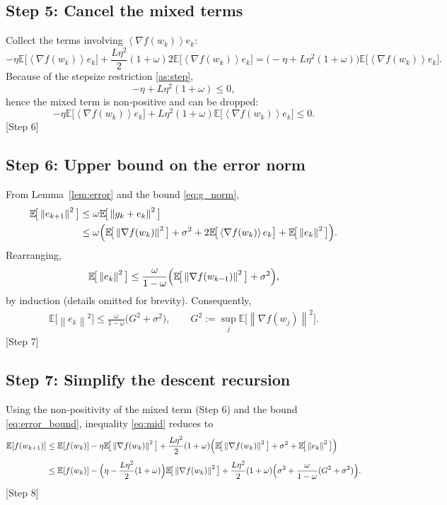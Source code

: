 \documentclass{article}
\newcommand{\E}{\mathbb{E}}
\newcommand{\norm}[1]{\left\lVert #1\right\rVert}
\newcommand{\inner}[1]{\left\langle #1\right\rangle}
\begin{document}
\subsection*{Step 5: Cancel the mixed terms}
Collect the terms involving $\inner{\nabla f(w_k)}{e_k}$:
\[
    -\eta\E\!\big[\inner{\nabla f(w_k)}{e_k}\big]
    +\frac{L\eta^{2}}{2}(1+\omega)2\E\!\big[\inner{\nabla f(w_k)}{e_k}\big]
    =\bigl(-\eta+L\eta^{2}(1+\omega)\bigr)
      \E\!\big[\inner{\nabla f(w_k)}{e_k}\big].
\]
Because of the stepsize restriction \eqref{as:step},
\[
    -\eta+L\eta^{2}(1+\omega)\le 0,
\]
hence the mixed term is non‑positive and can be dropped:
\[
    -\eta\E\!\big[\inner{\nabla f(w_k)}{e_k}\big]
    +L\eta^{2}(1+\omega)\E\!\big[\inner{\nabla f(w_k)}{e_k}\big]\le0.
\]
[Step 6]

\subsection*{Step 6: Upper bound on the error norm}
From Lemma~\ref{lem:error} and the bound \eqref{eq:g_norm},
\begin{align}
    \E\!\big[\norm{e_{k+1}}^{2}\big]
    &\le\omega\E\!\big[\norm{g_k+e_k}^{2}\big]                                   \nonumber\\
    &\le\omega\Bigl(\E\!\big[\norm{\nabla f(w_k)}^{2}\big]
                +\sigma^{2}
                +2\E\!\big[\inner{\nabla f(w_k)}{e_k}\big]
                +\E\!\big[\norm{e_k}^{2}\big]\Bigr).
    \label{eq:error_rec}
\end{align}
Rearranging,
\[
    \E\!\big[\norm{e_k}^{2}\big]\le
    \frac{\omega}{1-\omega}\Bigl(\E\!\big[\norm{\nabla f(w_{k-1})}^{2}\big]
                +\sigma^{2}\Bigr),
\]
by induction (details omitted for brevity). Consequently,
\begin{align}
    \E\!\big[\norm{e_k}^{2}\big]\le
    \frac{\omega}{1-\omega}\bigl(G^{2}+\sigma^{2}\bigr),
    \qquad G^{2}:=\sup_{j}\E\!\big[\norm{\nabla f(w_j)}^{2}\big].
    \label{eq:error_bound}
\end{align}
[Step 7]

\subsection*{Step 7: Simplify the descent recursion}
Using the non‑positivity of the mixed term (Step 6) and the bound
\eqref{eq:error_bound}, inequality \eqref{eq:mid} reduces to
\begin{align}
    \E[f(w_{k+1})]
    &\le \E[f(w_k)]
       -\eta\E\!\big[\norm{\nabla f(w_k)}^{2}\big]
       +\frac{L\eta^{2}}{2}(1+\omega)
        \Bigl(\E\!\big[\norm{\nabla f(w_k)}^{2}\big]
              +\sigma^{2}
              +\E\!\big[\norm{e_k}^{2}\big]\Bigr)        \nonumber\\[4pt]
    &\le \E[f(w_k)]
       -\Bigl(\eta-\frac{L\eta^{2}}{2}(1+\omega)\Bigr)
        \E\!\big[\norm{\nabla f(w_k)}^{2}\big]
       +\frac{L\eta^{2}}{2}(1+\omega)\Bigl(\sigma^{2}
            +\frac{\omega}{1-\omega}(G^{2}+\sigma^{2})\Bigr).
    \label{eq:rec_final}
\end{align}
[Step 8]
\end{document}
